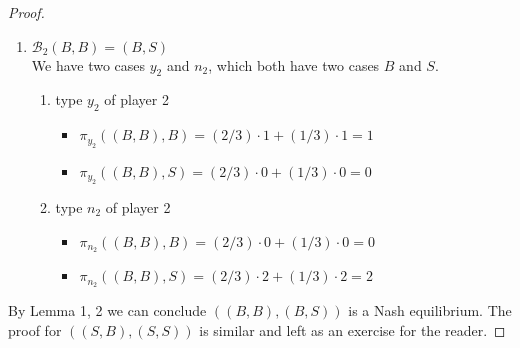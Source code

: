 \begin{example}
\begin{proof}
\begin{enumerate}[label=Lemma \arabic*.]
                  \item $\mathcal B_2 (B,B) = (B,S)$\\
                        We have two cases $y_2$ and $n_2$, which both have two cases $B$ and $S$.
                        \begin{enumerate}[label=(\roman*)]
                              \item type $y_2$ of player 2
                                    \begin{itemize}
                                          \item $\pi_{y_2} ((B,B),B) = (2/3)\cdot 1+(1/3)\cdot 1 = 1$
                                          \item $\pi_{y_2}((B,B),S) = (2/3)\cdot 0+(1/3)\cdot 0 = 0$
                                    \end{itemize}
                              \item type $n_2$ of player 2
                                    \begin{itemize}
                                          \item $\pi_{n_2}((B,B),B) = (2/3)\cdot 0+(1/3)\cdot 0 = 0$
                                          \item $\pi_{n_2} ((B,B),S) = (2/3)\cdot 2+(1/3)\cdot 2 = 2$
                                    \end{itemize}
                        \end{enumerate}
            \end{enumerate}
            By Lemma 1, 2 we can conclude $((B,B), (B,S))$ is a Nash equilibrium. 
            The proof for $((S,B), (S,S))$ is similar and left as an exercise for the reader.
      \end{proof}
\end{example}


